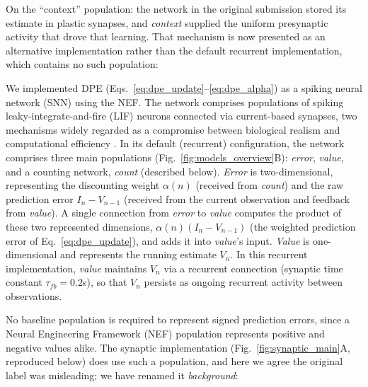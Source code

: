 On the ``context'' population: the network in the original submission stored its estimate in plastic synapses, and \textit{context} supplied the uniform presynaptic activity that drove that learning. That mechanism is now presented as an alternative implementation rather than the default recurrent implementation, which contains no such population:

\begin{ms}
We implemented DPE (Eqs.~\ref{eq:dpe_update}--\ref{eq:dpe_alpha}) as a spiking neural network (SNN) using the NEF. The network comprises populations of spiking leaky-integrate-and-fire (LIF) neurons connected via current-based synapses, two mechanisms widely regarded as a compromise between biological realism and computational efficiency \citep{eliasmith2013build, duggins2022constructing, gerstner2014neuronal, dayan2005theoretical}. In its default (recurrent) configuration, the network comprises three main populations (Fig.~\ref{fig:models_overview}B): \textit{error}, \textit{value}, and a counting network, \textit{count} (described below). \textit{Error} is two-dimensional, representing the discounting weight $\alpha(n)$ (received from \textit{count}) and the raw prediction error $I_n - V_{n-1}$ (received from the current observation and feedback from \textit{value}). A single connection from \textit{error} to \textit{value} computes the product of these two represented dimensions, $\alpha(n)(I_n-V_{n-1})$ (the weighted prediction error of Eq.~\ref{eq:dpe_update}), and adds it into \textit{value}'s input. \textit{Value} is one-dimensional and represents the running estimate $V_n$. In this recurrent implementation, \textit{value} maintains $V_n$ via a recurrent connection (synaptic time constant $\tau_{fb}=0.2$s), so that $V_n$ persists as ongoing recurrent activity between observations.
\end{ms}

No baseline population is required to represent signed prediction errors, since a Neural Engineering Framework (NEF) population represents positive and negative values alike. The synaptic implementation (Fig.~\ref{fig:synaptic_main}A, reproduced below) does use such a population, and here we agree the original label was misleading; we have renamed it \textit{background}:



